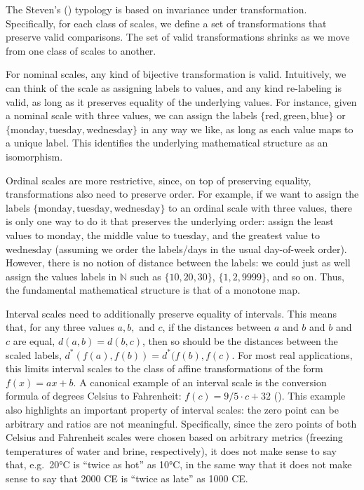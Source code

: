 \documentclass[
  openany]{book}
\theoremstyle{definition}
\theoremstyle{definition}
\theoremstyle{definition}
\theoremstyle{definition}
\theoremstyle{remark}
\begin{document}
The Steven's () typology is based on invariance under transformation. Specifically, for each class of scales, we define a set of transformations that preserve valid comparisons. The set of valid transformations shrinks as we move from one class of scales to another.

For nominal scales, any kind of bijective transformation is valid. Intuitively, we can think of the scale as assigning labels to values, and any kind re-labeling is valid, as long as it preserves equality of the underlying values. For instance, given a nominal scale with three values, we can assign the labels \(\{ \text{red}, \text{green}, \text{blue} \}\) or \(\{ \text{monday}, \text{tuesday}, \text{wednesday} \}\) in any way we like, as long as each value maps to a unique label. This identifies the underlying mathematical structure as an isomorphism.

Ordinal scales are more restrictive, since, on top of preserving equality, transformations also need to preserve order. For example, if we want to assign the labels \(\{ \text{monday}, \text{tuesday}, \text{wednesday} \}\) to an ordinal scale with three values, there is only one way to do it that preserves the underlying order: assign the least values to \(\text{monday}\), the middle value to \(\text{tuesday}\), and the greatest value to \(\text{wednesday}\) (assuming we order the labels/days in the usual day-of-week order). However, there is no notion of distance between the labels: we could just as well assign the values labels in \(\mathbb{N}\) such as \(\{ 10, 20, 30 \}\), \(\{1, 2, 9999 \}\), and so on. Thus, the fundamental mathematical structure is that of a monotone map.

Interval scales need to additionally preserve equality of intervals. This means that, for any three values \(a, b,\) and \(c\), if the distances between \(a\) and \(b\) and \(b\) and \(c\) are equal, \(d(a, b) = d(b, c)\), then so should be the distances between the scaled labels, \(d^*(f(a), f(b)) = d^*(f(b), f(c)\). For most real applications, this limits interval scales to the class of affine transformations of the form \(f(x) = ax + b\). A canonical example of an interval scale is the conversion formula of degrees Celsius to Fahrenheit: \(f(c) = 9/5 \cdot c + 32\) (). This example also highlights an important property of interval scales: the zero point can be arbitrary and ratios are not meaningful. Specifically, since the zero points of both Celsius and Fahrenheit scales were chosen based on arbitrary metrics (freezing temperatures of water and brine, respectively), it does not make sense to say that, e.g.~20°C is ``twice as hot'' as 10°C, in the same way that it does not make sense to say that 2000 CE is ``twice as late'' as 1000 CE.
\end{document}
